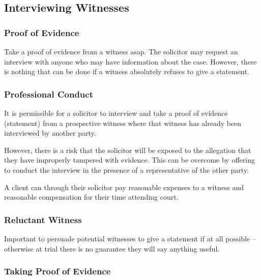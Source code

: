 \documentclass[
]{article}
\begin{document}
\hypertarget{interviewing-witnesses}{%
\subsection{Interviewing Witnesses}\label{interviewing-witnesses}}

\hypertarget{proof-of-evidence}{%
\subsubsection{Proof of Evidence}\label{proof-of-evidence}}

Take a proof of evidence from a witness asap. The solicitor may request
an interview with anyone who may have information about the case.
However, there is nothing that can be done if a witness absolutely
refuses to give a statement.

\hypertarget{professional-conduct-2}{%
\subsubsection{Professional Conduct}\label{professional-conduct-2}}

It is permissible for a solicitor to interview and take a proof of
evidence (statement) from a prospective witness where that witness has
already been interviewed by another party.

However, there is a risk that the solicitor will be exposed to the
allegation that they have improperly tampered with evidence. This can be
overcome by offering to conduct the interview in the presence of a
representative of the other party.

A client can through their solicitor pay reasonable expenses to a
witness and reasonable compensation for their time attending court.

\hypertarget{reluctant-witness}{%
\subsubsection{Reluctant Witness}\label{reluctant-witness}}

Important to persuade potential witnesses to give a statement if at all
possible -- otherwise at trial there is no guarantee they will say
anything useful.

\hypertarget{taking-proof-of-evidence}{%
\subsubsection{Taking Proof of
Evidence}\label{taking-proof-of-evidence}}
\end{document}
